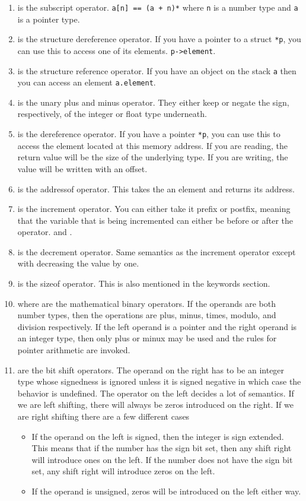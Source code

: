 \begin{enumerate}
\item \keyword{[]} is the subscript operator. \texttt{a[n] == (a + n)*} where \texttt{n} is a number type and \texttt{a} is a pointer type.
\item \keyword{->} is the structure dereference operator. If you have a pointer to a struct \texttt{*p}, you can use this to access one of its elements. \texttt{p->element}.
\item {} is the structure reference operator. If you have an object on the stack \texttt{a} then you can access an element \texttt{a.element}.
\item {} is the unary plus and minus operator. They either keep or negate the sign, respectively, of the integer or float type underneath.
\item {} is the dereference operator. If you have a pointer  \texttt{*p}, you can use this to access the element located at this memory address. If you are reading, the return value will be the size of the underlying type. If you are writing, the value will be written with an offset.
\item {} is the addressof operator. This takes the an element and returns its address.
\item \keyword{++} is the increment operator. You can either take it prefix or postfix, meaning that the variable that is being incremented can either be before or after the operator.  and .
\item \keyword{--} is the decrement operator. Same semantics as the increment operator except with decreasing the value by one.
\item {} is the sizeof operator. This is also mentioned in the keywords section.
\item {} where  are the mathematical binary operators. If the operands are both number types, then the operations are plus, minus, times, modulo, and division respectively. If the left operand is a pointer and the right operand is an integer type, then only plus or minux may be used and the rules for pointer arithmetic are invoked.
\item \keyword{>>/<<} are the bit shift operators. The operand on the right has to be an integer type whose signedness is ignored unless it is signed negative in which case the behavior is undefined. The operator on the left decides a lot of semantics. If we are left shifting, there will always be zeros introduced on the right. If we are right shifting there are a few different cases
\begin{itemize}
\item If the operand on the left is signed, then the integer is sign extended. This means that if the number has the sign bit set, then any shift right will introduce ones on the left. If the number does not have the sign bit set, any shift right will introduce zeros on the left.
\item If the operand is unsigned, zeros will be introduced on the left either way.
\end{itemize}


\end{enumerate}
